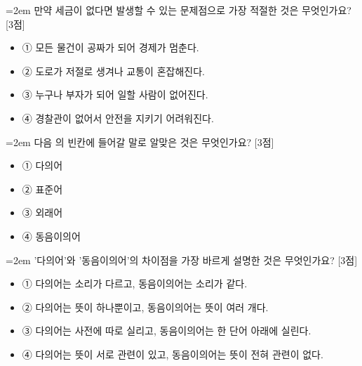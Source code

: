 \documentclass[12pt,a4paper]{article}
\newcommand{\qnum}[1]{%
  \tikz[baseline=(num.base)]{%
    \node[circle, fill=numCircle, text=white, inner sep=0pt,
          minimum size=18pt, font=\small\bfseries] (num) {#1};%
  }%
}
\newcommand{\pts}[1]{%
  \hfill\textcolor{ptsBadge}{[#1점]}%
}
\begin{document}
\vspace{4mm}
\begin{minipage}{\columnwidth}
{\hangindent=2em
\qnum{15}\enspace 만약 세금이 없다면 발생할 수 있는 문제점으로 가장 적절한 것은 무엇인가요? \pts{3}
\par}

\vspace{3mm}
\begin{itemize}[leftmargin=2.5em, labelsep=0.3em, label={}, itemsep=4pt, parsep=1pt, topsep=0pt]
  \item ① 모든 물건이 공짜가 되어 경제가 멈춘다.
  \item ② 도로가 저절로 생겨나 교통이 혼잡해진다.
  \item ③ 누구나 부자가 되어 일할 사람이 없어진다.
  \item ④ 경찰관이 없어서 안전을 지키기 어려워진다.
\end{itemize}
\end{minipage}
\vspace{4mm}

\vspace{4mm}
\begin{minipage}{\columnwidth}
{\hangindent=2em
\qnum{16}\enspace 다음 의 빈칸에 들어갈 말로 알맞은 것은 무엇인가요? \pts{3}
\par}

\vspace{3mm}
\begin{itemize}[leftmargin=2.5em, labelsep=0.3em, label={}, itemsep=4pt, parsep=1pt, topsep=0pt]
  \item ① 다의어
  \item ② 표준어
  \item ③ 외래어
  \item ④ 동음이의어
\end{itemize}
\end{minipage}
\vspace{4mm}

\vspace{4mm}
\begin{minipage}{\columnwidth}
{\hangindent=2em
\qnum{17}\enspace '다의어'와 '동음이의어'의 차이점을 가장 바르게 설명한 것은 무엇인가요? \pts{3}
\par}

\vspace{3mm}
\begin{itemize}[leftmargin=2.5em, labelsep=0.3em, label={}, itemsep=4pt, parsep=1pt, topsep=0pt]
  \item ① 다의어는 소리가 다르고, 동음이의어는 소리가 같다.
  \item ② 다의어는 뜻이 하나뿐이고, 동음이의어는 뜻이 여러 개다.
  \item ③ 다의어는 사전에 따로 실리고, 동음이의어는 한 단어 아래에 실린다.
  \item ④ 다의어는 뜻이 서로 관련이 있고, 동음이의어는 뜻이 전혀 관련이 없다.
\end{itemize}
\end{minipage}
\vspace{4mm}
\end{document}
